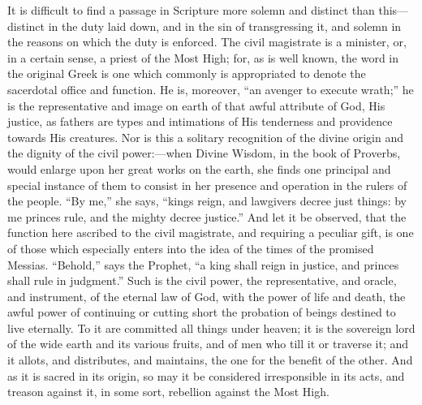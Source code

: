 It is difficult to find a passage in Scripture more solemn and
distinct than this—distinct in the duty laid down, and in the sin of
transgressing it, and solemn in the reasons on which the duty is
enforced. The civil magistrate is a minister, or, in a certain sense,
a priest of the Most High; for, as is well known, the word in the
original Greek is one which commonly is appropriated to denote the
sacerdotal office and function. He is, moreover, ``an avenger to
execute wrath;'' he is the representative and image on earth of
that awful attribute of God, His justice, as fathers are types and
intimations of His tenderness and providence towards His creatures.
Nor is this a solitary recognition of the divine origin and the
dignity of the civil power:—when Divine Wisdom, in the book of
Proverbs, would enlarge upon her great works on the earth, she finds
one principal and special instance of them to consist in her presence
and operation in the rulers of the people. ``By me,'' she
says, ``kings reign, and lawgivers decree just things: by me
princes rule, and the mighty decree justice.'' And let it be
observed, that the function here ascribed to the civil magistrate, and
requiring a peculiar gift, is one of those which especially enters
into the idea of the times of the promised Messias.
``Behold,'' says the Prophet, ``a king shall reign in
justice, and princes shall rule in judgment.'' Such is the civil
power, the representative, and oracle, and instrument, of the eternal
law of God, with the power of life and death, the awful power of
continuing or cutting short the probation of beings destined to live
eternally. To it are committed all things under heaven; it is the
sovereign lord of the wide earth and its various fruits, and of men
who till it or traverse it; and it allots, and distributes, and
maintains, the one for the benefit of the other. And as it is sacred
in its origin, so may it be considered irresponsible in its acts, and
treason against it, in some sort, rebellion against the Most High.


